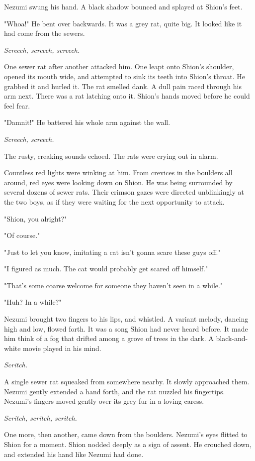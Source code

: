 Nezumi swung his hand. A black shadow bounced and splayed at Shion's
feet.

"Whoa!" He bent over backwards. It was a grey rat, quite big. It looked
like it had come from the sewers.

\emph{Screech, screech, screech.}

One sewer rat after another attacked him. One leapt onto Shion's
shoulder, opened its mouth wide, and attempted to sink its teeth into
Shion's throat. He grabbed it and hurled it. The rat smelled dank. A
dull pain raced through his arm next. There was a rat latching onto it.
Shion's hands moved before he could feel fear.

"Damnit!" He battered his whole arm against the wall.

\emph{Screech, screech.}

The rusty, creaking sounds echoed. The rats were crying out in alarm.

Countless red lights were winking at him. From crevices in the boulders
all around, red eyes were looking down on Shion. He was being surrounded
by several dozens of sewer rats. Their crimson gazes were directed
unblinkingly at the two boys, as if they were waiting for the next
opportunity to attack.

"Shion, you alright?"

"Of course."

"Just to let you know, imitating a cat isn't gonna scare these guys
off."

"I figured as much. The cat would probably get scared off himself."

"That's some coarse welcome for someone they haven't seen in a while."

"Huh? In a while?"

Nezumi brought two fingers to his lips, and whistled. A variant melody,
dancing high and low, flowed forth. It was a song Shion had never heard
before. It made him think of a fog that drifted among a grove of trees
in the dark. A black-and-white movie played in his mind.

\emph{Scritch.}

A single sewer rat squeaked from somewhere nearby. It slowly approached
them. Nezumi gently extended a hand forth, and the rat nuzzled his
fingertips. Nezumi's fingers moved gently over its grey fur in a loving
caress.

\emph{Scritch, scritch, scritch.}

One more, then another, came down from the boulders. Nezumi's eyes
flitted to Shion for a moment. Shion nodded deeply as a sign of assent.
He crouched down, and extended his hand like Nezumi had done.

